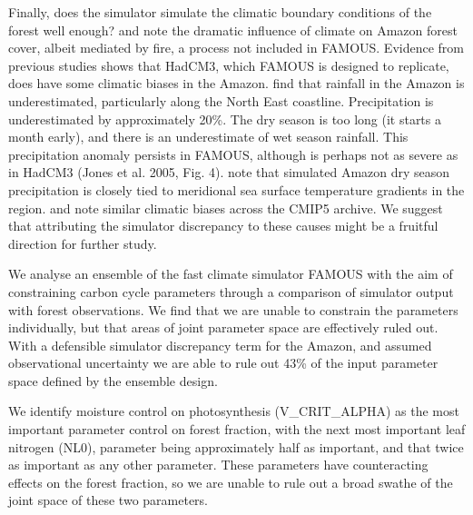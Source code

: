 \documentclass[esd, manuscript]{copernicus}
\begin{document}
Finally, does the simulator simulate the climatic boundary conditions of the forest well enough? \cite{malhi2009amazon} and \cite{staver2011determinants} note the dramatic influence of climate on Amazon forest cover, albeit mediated by fire, a process not included in FAMOUS. Evidence from previous studies shows that HadCM3, which FAMOUS is designed to replicate, does have some climatic biases in the Amazon. \cite{cox2004amazon} find that rainfall in the Amazon is underestimated, particularly along the North East coastline. Precipitation is underestimated by approximately 20\%. The dry season is too long (it starts a month early), and there is an underestimate of wet season rainfall. This precipitation anomaly persists in FAMOUS, although is perhaps not as severe as in HadCM3 (Jones et al. 2005, Fig. 4). \cite{good2008objective} note that simulated Amazon dry season precipitation is closely tied to meridional sea surface temperature gradients in the region. \cite{joetzjer2013amazon} and \cite{yin2012precipitation} note similar climatic biases across the CMIP5 archive. We suggest that attributing the simulator discrepancy to these causes might be a fruitful direction for further study.

\conclusions \label{sec:conclusions} %

We analyse an ensemble of the fast climate simulator FAMOUS with the aim of constraining carbon cycle parameters through a comparison of simulator output with forest observations. We find that we are unable to constrain the parameters individually, but that areas of joint parameter space are effectively ruled out. With a defensible simulator discrepancy term for the Amazon, and assumed observational uncertainty we are able to rule out 43\% of the input parameter space defined by the ensemble design.

We identify moisture control on photosynthesis (V\_CRIT\_ALPHA) as the most important parameter control on forest fraction, with the next most important leaf nitrogen (NL0), parameter being approximately half as important, and that twice as important as any other parameter. These parameters have counteracting effects on the forest fraction, so we are unable to rule out a broad swathe of the joint space of these two parameters.
\end{document}
